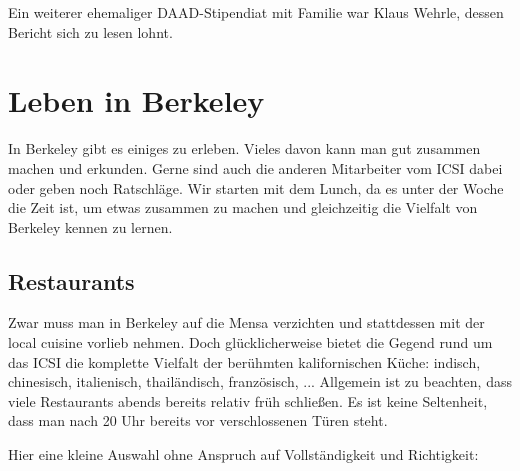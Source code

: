 \documentclass[a4paper]{scrreprt}
\begin{document}
Ein weiterer ehemaliger DAAD-Stipendiat mit Familie war Klaus Wehrle, dessen Bericht sich zu lesen lohnt.

\chapter{Leben in Berkeley}

In Berkeley gibt es einiges zu erleben. Vieles davon kann man gut zusammen machen und erkunden. Gerne sind auch die anderen Mitarbeiter vom ICSI dabei oder geben noch Ratschläge. Wir starten mit dem Lunch, da es unter der Woche die Zeit ist, um etwas zusammen zu machen und gleichzeitig die Vielfalt von Berkeley kennen zu lernen.

\section{Restaurants}

Zwar muss man in Berkeley auf die Mensa verzichten und stattdessen mit der local cuisine vorlieb nehmen. Doch glücklicherweise bietet die Gegend rund um das ICSI die komplette Vielfalt der berühmten kalifornischen Küche: indisch, chinesisch, italienisch, thailändisch, französisch, ... Allgemein ist zu beachten, dass viele Restaurants abends bereits relativ früh schließen. Es ist keine Seltenheit, dass man nach 20 Uhr bereits vor verschlossenen Türen steht.

Hier eine kleine Auswahl ohne Anspruch auf Vollständigkeit und Richtigkeit: %
\end{document}
